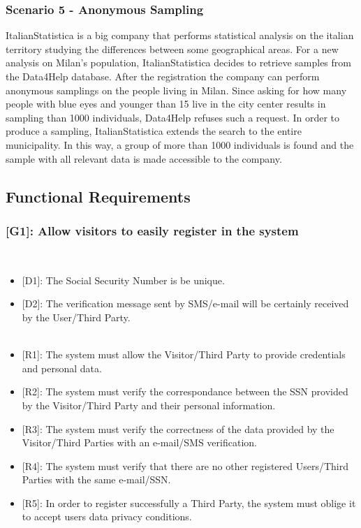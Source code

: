 \documentclass[12pt,a4paper]{article}
\begin{document}
	
	\subsubsection*{Scenario 5 - Anonymous Sampling}
	ItalianStatistica is a big company that performs statistical analysis on the italian territory studying the differences between some geographical areas. For a new analysis on Milan's population, ItalianStatistica decides to retrieve samples from the Data4Help database. After the registration the company can perform anonymous samplings on the people living in Milan. Since asking for how many people with blue eyes and younger than 15 live in the city center results in sampling than 1000 individuals, Data4Help refuses such a request. In order to produce a sampling, ItalianStatistica extends the search to the entire municipality. In this way, a group of more than 1000 individuals is found and the sample with all relevant data is made accessible to the company.
	
	\newpage
	
	\subsection{Functional Requirements}
	
	\subsubsection*{{[}{G1}{]}: Allow visitors to easily register in the system}
	\begin{itemize}\\
		\begin{itemize}
			\item {[D1]}: The Social Security Number is be unique.
			\item {[D2]}: The verification message sent by SMS/e-mail will be certainly received by the User/Third Party.
			\\\\
			\item {[R1]}: The system must allow the Visitor/Third Party to provide credentials and personal data.
			\item {[R2]}: The system must verify the correspondance between the SSN provided by the Visitor/Third Party and their personal information.
			\item {[R3]}: The system must verify the correctness of the data provided by the Visitor/Third Parties with an e-mail/SMS verification.
			\item {[R4]}: The system must verify that there are no other registered Users/Third Parties with the same e-mail/SSN.
			\item {[R5]}: In order to register successfully a Third Party, the system must oblige it to accept users data privacy conditions.
		\end{itemize} 
	\end{itemize}
\end{document}
